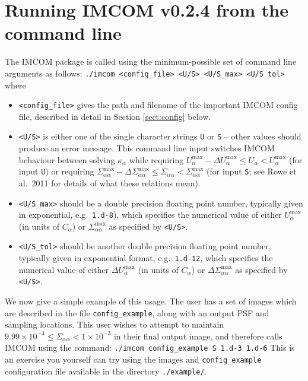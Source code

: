 \documentclass[10pt]{article}
\begin{document}
\section{Running IMCOM v0.2.4 from the command line}
The IMCOM package is called using the minimum-possible set of command line arguments as follows:
\newline
\newline
\indent \texttt{./imcom <config\_file> <U/S> <U/S\_max> <U/S\_tol>}
\newline
\newline
where
\begin{itemize}
\item \texttt{<config\_file>} gives the path and filename of the important IMCOM config file, described in detail in Section \ref{sect:config} below.

\item \texttt{<U/S>} is either one of the single character strings \texttt{U} or \texttt{S} -- other values should produce an error message.  This command line input switches IMCOM behaviour between solving $\kappa_{\alpha}$ while requiring $U_{\alpha}^{\textrm{max}} - \Delta U_{\alpha}^{\textrm{max}} \le U_{\alpha} < U_{\alpha}^{\textrm{max}}$ (for input \texttt{U}) or requiring $ \Sigma_{\alpha \alpha}^{\textrm{max}} - \Delta \Sigma_{\alpha \alpha}^{\textrm{max}} \le \Sigma_{\alpha \alpha} < \Sigma_{\alpha \alpha}^{\textrm{max}}$ (for input \texttt{S}; see Rowe et al.\ 2011 for details of what these relations mean).

\item \texttt{<U/S\_max>} should be a double precision floating point number, typically given in exponential, e.g.\ \texttt{1.d-8}), which specifies the numerical value of either $U_{\alpha}^{\textrm{max}}$ (in units of $C_{\alpha}$) or $\Sigma_{\alpha \alpha}^{\textrm{max}}$ as specified by \texttt{<U/S>}.

\item \texttt{<U/S\_tol>} should be another double precision floating point number, typically given in exponential format, e.g.\ \texttt{1.d-12}, which specifies the numerical value of either $\Delta U_{\alpha}^{\textrm{max}}$ (in units of $C_{\alpha}$) or $\Delta \Sigma_{\alpha \alpha}^{\textrm{max}}$ as specified by \texttt{<U/S>}.
\end{itemize}

We now give a simple example of this usage. The user has a set of images which are described in the file \texttt{config\_example}, along with an output PSF and sampling locations.  This user wishes to attempt to maintain $9.99 \times 10^{-4} \le \Sigma_{\alpha \alpha} < 1 \times 10^{-3}$ in their final output image, and therefore calls IMCOM using the command:
\newline
\newline
\texttt{./imcom config\_example S 1.d-3 1.d-6}
\newline
\newline
This is an exercise you yourself can try using the images and \texttt{config\_example} configuration file available in the directory \texttt{./example/}.
\end{document}
